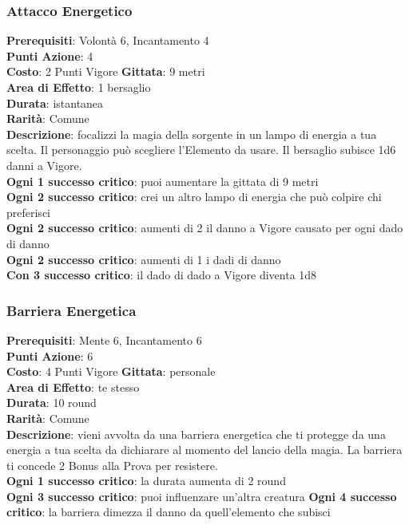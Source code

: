 \documentclass[12pt,a4paper,twoside,openany]{book}
\begin{document}
\begin{multicols}{2}
\subsubsection*{Attacco Energetico}
\textbf{Prerequisiti}: Volontà 6, Incantamento 4\\
\textbf{Punti Azione}: 4\\
\textbf{Costo}: 2 Punti Vigore
\textbf{Gittata}: 9 metri\\
\textbf{Area di Effetto}: 1 bersaglio\\
\textbf{Durata}: istantanea\\
\textbf{Rarità}: Comune\\
\textbf{Descrizione}: focalizzi la magia della sorgente in un lampo di energia a tua scelta. Il personaggio può scegliere l'Elemento da usare.
Il bersaglio subisce 1d6 danni a Vigore.\\
\textbf{Ogni 1 successo critico}: puoi aumentare la gittata di 9 metri\\
\textbf{Ogni 2 successo critico}: crei un altro lampo di energia che può colpire chi preferisci\\
\textbf{Ogni 2 successo critico}: aumenti di 2 il danno a Vigore causato per ogni dado di danno\\
\textbf{Ogni 2 successo critico}: aumenti di 1 i dadi di danno\\
\textbf{Con 3 successo critico}: il dado di dado a Vigore diventa 1d8

\subsubsection*{Barriera Energetica}
\textbf{Prerequisiti}: Mente 6, Incantamento 6\\
\textbf{Punti Azione}: 6\\
\textbf{Costo}: 4 Punti Vigore
\textbf{Gittata}: personale\\
\textbf{Area di Effetto}: te stesso\\
\textbf{Durata}: 10 round\\
\textbf{Rarità}: Comune\\
\textbf{Descrizione}: vieni avvolta da una barriera energetica che ti protegge da una energia a tua scelta da dichiarare al momento del lancio della magia. La barriera ti concede 2 Bonus alla Prova per resistere.\\
\textbf{Ogni 1 successo critico}: la durata aumenta di 2 round\\
\textbf{Ogni 3 successo critico}: puoi influenzare un'altra creatura
\textbf{Ogni 4 successo critico}: la barriera dimezza il danno da quell'elemento che subisci


\end{multicols}
\end{document}
